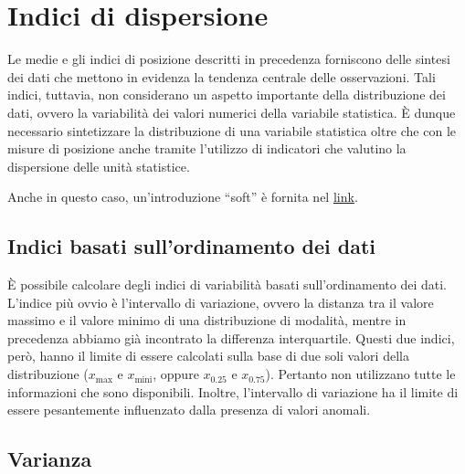\documentclass[
  11pt,
  italian,
  a4paper,
  extrafontsizes,onecolumn,openright
  ]{memoir}
\theoremstyle{definition}
\theoremstyle{definition}
\theoremstyle{definition}
\theoremstyle{definition}
\theoremstyle{remark}
\begin{document}
\hypertarget{indici-di-dispersione}{%
\section{Indici di dispersione}\label{indici-di-dispersione}}

Le medie e gli indici di posizione descritti in precedenza forniscono
delle sintesi dei dati che mettono in evidenza la tendenza centrale
delle osservazioni. Tali indici, tuttavia, non considerano un aspetto
importante della distribuzione dei dati, ovvero la variabilità dei
valori numerici della variabile statistica. È dunque necessario
sintetizzare la distribuzione di una variabile statistica oltre che con
le misure di posizione anche tramite l'utilizzo di indicatori che
valutino la dispersione delle unità statistice.

Anche in questo caso, un'introduzione ``soft'' è fornita nel \href{https://tinystats.github.io/teacups-giraffes-and-statistics/04_variance.html}{link}.

\hypertarget{indici-basati-sullordinamento-dei-dati}{%
\subsection{Indici basati sull'ordinamento dei dati}\label{indici-basati-sullordinamento-dei-dati}}

È possibile calcolare degli indici di variabilità basati
sull'ordinamento dei dati. L'indice più ovvio è l'intervallo di
variazione, ovvero la distanza tra il valore massimo e il valore minimo
di una distribuzione di modalità, mentre in precedenza abbiamo già
incontrato la differenza interquartile. Questi due indici, però, hanno
il limite di essere calcolati sulla base di due soli valori della
distribuzione (\(x_{\text{max}}\) e \(x_{\text{mini}}\), oppure \(x_{0.25}\) e
\(x_{0.75}\)). Pertanto non utilizzano tutte le informazioni che sono
disponibili. Inoltre, l'intervallo di variazione ha il limite di essere
pesantemente influenzato dalla presenza di valori anomali.

\hypertarget{varianza}{%
\subsection{Varianza}\label{varianza}}
\end{document}
